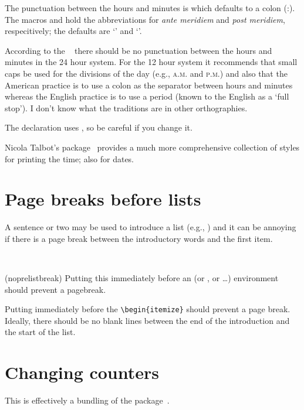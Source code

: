     The punctuation between the hours and minutes is \cmd{\hmpunct} which
defaults to a colon (:). The macros \cmd{\amname} and \cmd{\pmnane} hold 
the abbreviations for \textit{ante meridiem} and \textit{post meridiem}, 
respecitively; the defaults are `\amname' and `\pmname'. 

    According to the ~\cite{CMS} there 
should be no punctuation between the hours and minutes in the 24 hour system.
For the 12 hour system it recommends that small caps be used for the
divisions of the day (e.g., \textsc{a.m.} and \textsc{p.m.}) and also
that the American practice is to use a colon as the separator between
hours and minutes whereas the English practice is to use a period (known
to the English as a `full stop'). I don't know what the traditions are
in other orthographies.

    The \cmd{\quarkmarks} declaration uses \cmd{\printtime}, so be careful
if you change it.

    Nicola Talbot's  package~\cite{DATETIME} provides
a much more comprehensive collection of styles for printing the time;
also for dates.

\section{Page breaks before lists}

   A sentence or two may be used to introduce a list (e.g., )
and it can be annoying if there is a page break between the introductory words
and the first item.
\begin{syntax}
\cmd{\noprelistbreak} \\
\end{syntax}
\glossary(noprelistbreak)%
  {}%
  {Putting this immediately before an  (or , or \ldots) 
   environment should prevent a pagebreak.}

Putting \cmd{\noprelistbreak} immediately before the \verb?\begin{itemize}?
should prevent a page break. Ideally, there should be no blank lines
between the end of the introduction and the start of the list. 

\section{Changing counters}

    This is effectively a bundling of the  
package~\cite{CHNGCNTR}.

